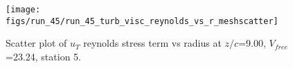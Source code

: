 \begin{figure}[H]
\centering
\texttt{[image: figs/run\_45/run\_45\_turb\_visc\_reynolds\_vs\_r\_meshscatter]}
\caption{Scatter plot of $
u_T$ reynolds stress term vs radius at $z/c$=9.00, $V_{free}$=23.24, station 5.}
\label{fig:run_45_turb_visc_reynolds_vs_r_meshscatter}
\end{figure}


